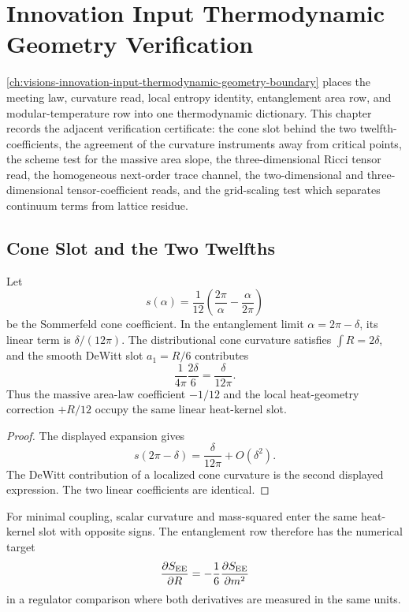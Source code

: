 \chapter{Innovation Input Thermodynamic Geometry Verification}
\label{ch:visions-innovation-input-thermodynamic-geometry-verification}

\autoref{ch:visions-innovation-input-thermodynamic-geometry-boundary}
places the meeting law, curvature read, local entropy identity,
entanglement area row, and modular-temperature row into one
thermodynamic dictionary. This chapter records the adjacent verification
certificate: the cone slot behind the two twelfth-coefficients, the
agreement of the curvature instruments away from critical points, the
scheme test for the massive area slope, the three-dimensional Ricci tensor
read, the homogeneous next-order trace channel, the two-dimensional
and three-dimensional tensor-coefficient reads, and the grid-scaling test
which separates continuum terms from lattice residue.

\section{Cone Slot and the Two Twelfths}
\label{sec:innovation-input-thermo-verification-cone-slot}

\begin{theorem}
\label{thm:innovation-input-thermo-cone-slot}
Let
$$
s(\alpha)
=
\frac{1}{12}
\left(
\frac{2\pi}{\alpha}
-
\frac{\alpha}{2\pi}
\right)
$$
be the Sommerfeld cone coefficient. In the entanglement limit
$\alpha=2\pi-\delta$, its linear term is $\delta/(12\pi)$. The
distributional cone curvature satisfies $\int R=2\delta$, and the smooth
DeWitt slot $a_1=R/6$ contributes
$$
\frac{1}{4\pi}\frac{2\delta}{6}
=
\frac{\delta}{12\pi}.
$$
Thus the massive area-law coefficient $-1/12$ and the local
heat-geometry correction $+R/12$ occupy the same linear heat-kernel slot.
\end{theorem}

\begin{proof}
The displayed expansion gives
$$
s(2\pi-\delta)
=
\frac{\delta}{12\pi}+O(\delta^2).
$$
The DeWitt contribution of a localized cone curvature is the second
displayed expression. The two linear coefficients are identical.
\end{proof}

\begin{corollary}
\label{cor:innovation-input-thermo-curvature-mass-slot-target}
For minimal coupling, scalar curvature and mass-squared enter the same
heat-kernel slot with opposite signs. The entanglement row therefore has
the numerical target
$$
\frac{\partial S_{\rm EE}}{\partial R}
=
-
\frac16
\frac{\partial S_{\rm EE}}{\partial m^2}
$$
in a regulator comparison where both derivatives are measured in the same
units.
\end{corollary}

